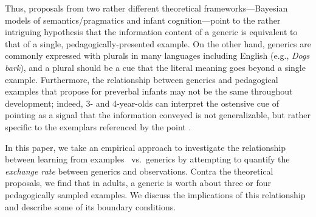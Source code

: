 \documentclass[10pt,letterpaper]{article}
\newcommand{\soph}[1]{\textcolor{Green}{[sb: #1]}}
\newcommand{\mht}[1]{\textcolor{Blue}{[mht: #1]}}
\begin{document}
Thus, proposals from two rather different theoretical frameworks---Bayesian models of semantics/pragmatics and infant cognition---point to the rather intriguing hypothesis that the information content of a generic is equivalent to that of a single, pedagogically-presented example.
On the other hand, generics are commonly expressed with plurals in many languages including English (e.g., \emph{Dogs bark}), and a plural should be a cue that the literal meaning goes beyond a single example.
Furthermore, the relationship between generics and pedagogical examples that  propose for preverbal infants may not be the same throughout development; indeed, 3- and 4-year-olds can interpret the ostensive cue of pointing as a signal that the information conveyed is not generalizable, but rather specific to the exemplars referenced by the point \cite{meyer2013pointing}.



In this paper, we take an empirical approach to investigate the relationship between learning from examples ~vs.~generics by attempting to quantify the \emph{exchange rate} between generics and observations. 
Contra the theoretical proposals, we find that in adults, a generic is worth about three or four pedagogically sampled examples. 
We discuss the implications of this relationship and describe some of its boundary conditions.
\end{document}
